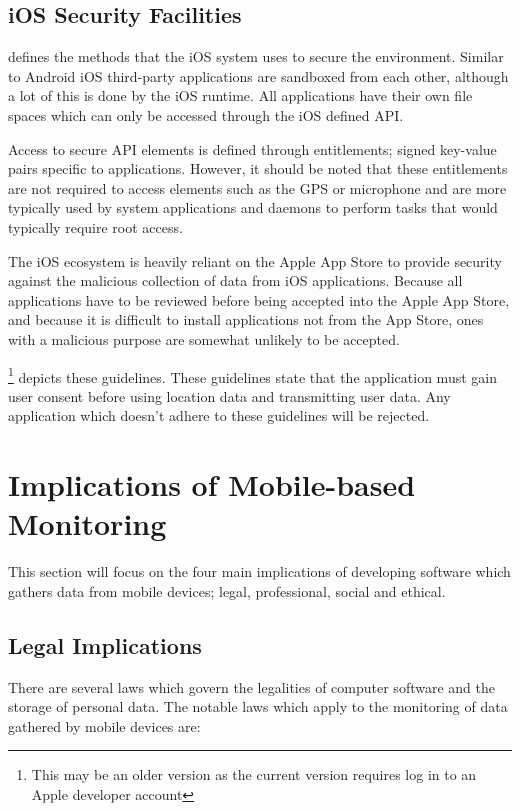 \documentclass[12pt, a4paper]{article}
\begin{document}
\nocite{lockheimer2012android}

\subsection{iOS Security Facilities}
\cite{apple2012security} defines the methods that the iOS system uses to secure
the environment. Similar to Android iOS third-party applications are sandboxed 
from each other, although a lot of this is done by the iOS runtime. All
applications have their own file spaces which can only be accessed through the
iOS defined API.

Access to secure API elements is defined through entitlements; signed key-value
pairs specific to applications. However, it should be noted that these
entitlements are not required to access elements such as the GPS or microphone
and are more typically used by system applications and daemons to perform tasks
that would typically require root access.

The iOS ecosystem is heavily reliant on the Apple App
Store to provide security against the malicious
collection of data from iOS applications. Because all applications have to be
reviewed before being accepted into the Apple App Store, and because it is
difficult to install applications not from the App Store, ones with a malicious
purpose are somewhat unlikely to be accepted.

\cite{apple2010review}\footnote{This may be an older version as the current
version requires log in to an Apple developer account} depicts these
guidelines. These guidelines state that the application must gain user consent
before using location data and transmitting user data. Any application which
doesn't adhere to these guidelines will be rejected.


\section{Implications of Mobile-based Monitoring}

This section will focus on the four main implications of developing software
which gathers data from mobile devices; legal, professional, social and
ethical.


\subsection{Legal Implications}

There are several laws which govern the legalities of computer software and the
storage of personal data. The notable laws which apply to the monitoring of
data gathered by mobile devices are:
\end{document}
